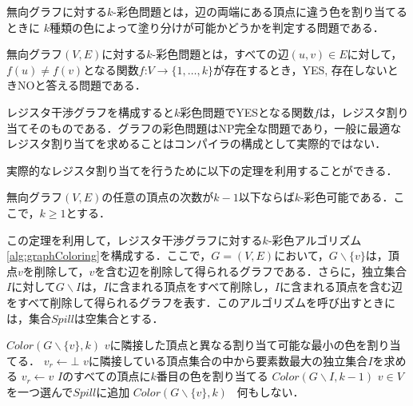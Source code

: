 \documentclass[dvipdfmx,a4j]{jbook}
\begin{document}
無向グラフに対する$k$-彩色問題とは，辺の両端にある頂点に違う色を割り当てるときに
$k$種類の色によって塗り分けが可能かどうかを判定する問題である．

\begin{Def}
    無向グラフ$(V,E)$に対する$k$-彩色問題とは，すべての辺$(u,v)\in E$に対して，$f(u)\not=f(v)$となる関数$f$:$V\rightarrow\{1,\ldots,k\}$が存在するとき，YES, 存在しないときNOと答える問題である．
\end{Def}

レジスタ干渉グラフを構成すると$k$彩色問題でYESとなる関数$f$は，レジスタ割り当てそのものである．グラフの彩色問題はNP完全な問題であり，一般に最適なレジスタ割り当てを求めることはコンパイラの構成として実際的ではない．

実際的なレジスタ割り当てを行うために以下の定理を利用することができる．

\begin{Thm}\label{thm:kindexGraph}
    無向グラフ$(V,E)$の任意の頂点の次数が$k-1$以下ならば$k$-彩色可能である．ここで，$k\geq 1$とする．
\end{Thm}

この定理を利用して，レジスタ干渉グラフに対する$k$-彩色アルゴリズム\ref{alg:graphColoring}を構成する．ここで，$G=(V,E)$において，$G\backslash\{v\}$は，頂点$v$を削除して，$v$を含む辺を削除して得られるグラフである．さらに，独立集合$I$に対して$G\backslash I$は，$I$に含まれる頂点をすべて削除し，$I$に含まれる頂点を含む辺をすべて削除して得られるグラフを表す．このアルゴリズムを呼び出すときには，集合$Spill$は空集合とする．

\begin{algorithm}
    \caption{レジスタ割り当ての彩色アルゴリズム}\label{alg:graphColoring}
    \begin{algorithmic}[1]
        \State $Color(G\backslash\{v\},k)$
        \State $v$に隣接した頂点と異なる割り当て可能な最小の色を割り当てる．
        \Else
        \State $v_r\leftarrow\bot$
        \State $v$に隣接している頂点集合の中から要素数最大の独立集合$I$を求める
        \State $v_r\leftarrow v$
        \EndIf
        \EndIf
        \EndFor
        \State $I$のすべての頂点に$k$番目の色を割り当てる
        \State $Color(G\backslash I,k-1)$
        \Else
        \State $v\in V$を一つ選んで$Spill$に追加
        \State $Color(G\backslash \{v\},k)$
        \EndIf
        \EndIf
        \Else\ 何もしない．
        \EndIf
        \EndProcedure
    \end{algorithmic}
\end{algorithm}
\end{document}
